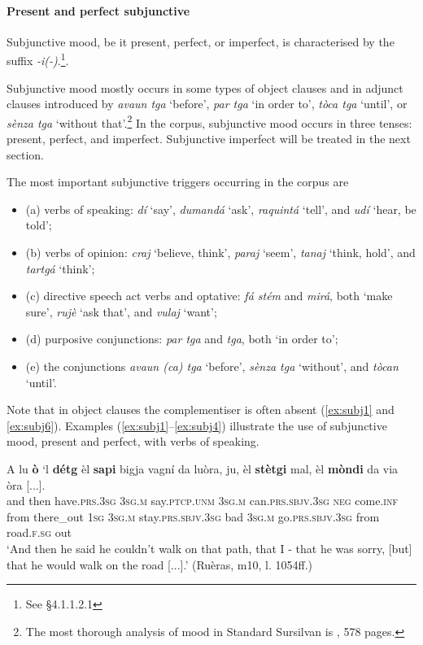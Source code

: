 \paragraph{Present and perfect subjunctive}
Subjunctive mood, be it present, perfect, or imperfect, is characterised by the suffix \textit{-i(-)}.\footnote{See §4.1.1.2.1}.

Subjunctive mood mostly occurs in some types of object clauses and in adjunct clauses introduced by \textit{avaun tga} `before', \textit{par tga} `in order to', \textit{tòca tga} `until', or \textit{sènza tga} `without that'.\footnote{The most thorough analysis of mood in Standard Sursilvan is \citet{Grünert2003}, 578 pages.} In the corpus, subjunctive mood occurs in three tenses: present, perfect, and imperfect. Subjunctive imperfect will be treated in the next section.

The most important subjunctive triggers occurring in the corpus are

\begin{itemize}
\item (a) verbs of speaking: \textit{dí} `say', \textit{dumandá} `ask', \textit{raquintá} `tell', and \textit{udí} `hear, be told';
\item (b) verbs of opinion: \textit{craj} `believe, think', \textit{paraj} `seem', \textit{tanaj} `think, hold', and \textit{tartgá} `think';
\item (c) directive speech act verbs and optative: \textit{fá stém} and \textit{mirá}, both `make sure', \textit{rujè} `ask that', and \textit{vulaj} `want';
\item (d) purposive conjunctions: \textit{par tga} and \textit{tga}, both `in order to';
\item (e) the conjunctions \textit{avaun (ca) tga} `before', \textit{sènza tga} `without', and \textit{tòcan} `until'.
\end{itemize}

Note that in object clauses the complementiser is often absent (\ref{ex:subj1} and \ref{ex:subj6}). Examples (\ref{ex:subj1}--\ref{ex:subj4}) illustrate the use of subjunctive mood, present and perfect, with verbs of speaking.

\ea
\label{ex:subj1}
\gll  A lu \textbf{ò} `l \textbf{détg} {\longrule} èl \textbf{sapi} bigja vagní da luòra, ju, èl {\longrule} \textbf{stètgi} mal, èl {\longrule} \textbf{mòndi} da via òra [...].  \\
and then have.\textsc{prs.3sg} \textsc{3sg.m} say.\textsc{ptcp.unm} {} \textsc{3sg.m} can.\textsc{prs.sbjv.3sg} \textsc{neg} come.\textsc{inf} from there\_out \textsc{1sg} \textsc{3sg.m} {} stay.\textsc{prs.sbjv.3sg} bad \textsc{3sg.m} {} go.\textsc{prs.sbjv.3sg} from road.\textsc{f.sg} out\\
\glt `And then he said he couldn’t walk on that path, that I - that he was sorry, [but] that he would walk on the road [...].' (Ruèras, m10, l. 1054ff.)
\z

